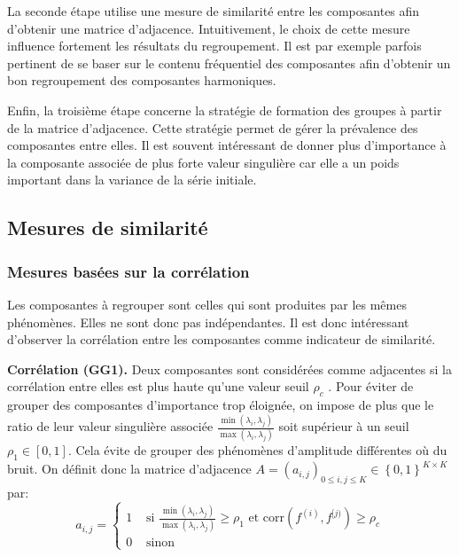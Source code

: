\documentclass{gretsi}
\newcommand{\inter}{\left[0, 1\right]}
\begin{document}
La seconde étape utilise une mesure de similarité entre les composantes afin d'obtenir une matrice d'adjacence. Intuitivement, le choix de cette mesure influence fortement les résultats du regroupement.
Il est par exemple parfois pertinent de se  baser sur le contenu fréquentiel des composantes afin d'obtenir un bon regroupement des composantes harmoniques.

Enfin, la troisième étape concerne la stratégie de formation des groupes à partir de la matrice d'adjacence. Cette stratégie permet de gérer la prévalence des composantes entre elles.
Il est souvent intéressant de donner plus d'importance à la composante associée de plus forte valeur singulière car elle a un poids important dans la variance de la série initiale.


\subsection{Mesures de similarité}
\label{sub:sim}

\subsubsection{Mesures basées sur la corrélation}\label{ssub:cor}

Les composantes à regrouper sont celles qui sont produites par les mêmes phénomènes.
Elles ne sont donc pas indépendantes.
Il est donc intéressant d'observer la corrélation entre les composantes comme indicateur de similarité.

\textbf{Corrélation (GG1).}\label{par:GG1}
    Deux composantes sont considérées comme adjacentes si la corrélation entre elles est plus haute qu'une valeur seuil $\rho_c$ \cite{abalov_14_auto}.
    Pour éviter de grouper des composantes d'importance trop éloignée, on impose de plus que le ratio de leur valeur singulière associée $\frac{\min(\lambda_i, \lambda_j)}{\max(\lambda_i, \lambda_j)}$ soit supérieur à un seuil $\rho_1 \in \inter$.
    Cela évite de grouper des phénomènes d'amplitude différentes où du bruit.
    On définit donc la matrice d'adjacence $A = (a_{i, j})_{0 \le i,j\le K} \in \left \{ 0, 1 \right \}^{K\times K}$ par:
    \begin{equation}
        a_{i, j} = \begin{cases}
	        1 &\text{ si } \displaystyle\frac{\min(\lambda_i, \lambda_j)}{\max(\lambda_i, \lambda_j)} \ge \rho_1 \text{ et } \text{corr}(f^{(i)}, f^{[j)}) \ge \rho_c\\
	        0& \text{ sinon}
        \end{cases}
    \end{equation}
\end{document}
